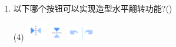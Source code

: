 \documentclass[10.5pt, a4paper]{article}
\begin{document}
\begin{enumerate}
        \item 以下哪个按钮可以实现造型水平翻转功能?(\qquad)
        \begin{tasks}(4)
            \task \includegraphics[width=.03\textwidth]{8a.png}
            \task \includegraphics[width=.03\textwidth]{8b.png}
            \task \includegraphics[width=.03\textwidth]{8c.png}
            \task \includegraphics[width=.02\textwidth]{8d.png}
        \end{tasks}


\end{enumerate}
\end{document}
